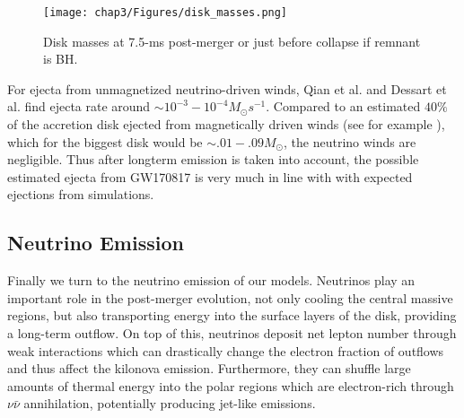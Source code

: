 
\begin{figure}[!htbp]
\texttt{[image: chap3/Figures/disk\_masses.png]}
\caption{
  Disk masses at 7.5-ms post-merger or just before collapse if remnant is BH.
}
\label{fig:disk_masses}
\end{figure}

For ejecta from unmagnetized neutrino-driven winds, Qian et al. and Dessart et al. \cite{qian1996nucleosynthesis,dessart2009} find ejecta rate around $\sim 10^{-3} - 10^{-4}M_\odot s^{-1}$. Compared to an estimated $40\%$ of the accretion disk ejected from magnetically driven winds (see for example \cite{fernandez2019long}), which for the biggest disk would be $\sim .01-.09M_\odot$, the neutrino winds are negligible. Thus after longterm emission is taken into account, the possible estimated ejecta from GW170817 is very much in line with with expected ejections from simulations.

\subsection{Neutrino Emission}
%
Finally we turn to the neutrino emission of our models. Neutrinos play an important role in the post-merger evolution, not only cooling the central massive regions, but also transporting energy into the surface layers of the disk, providing a long-term outflow. On top of this, neutrinos deposit net lepton number through weak interactions which can drastically change the electron fraction of outflows and thus affect the kilonova emission. Furthermore, they can shuffle large amounts of thermal energy into the polar regions which are electron-rich through $\nu\bar\nu$ annihilation, potentially producing jet-like emissions.

